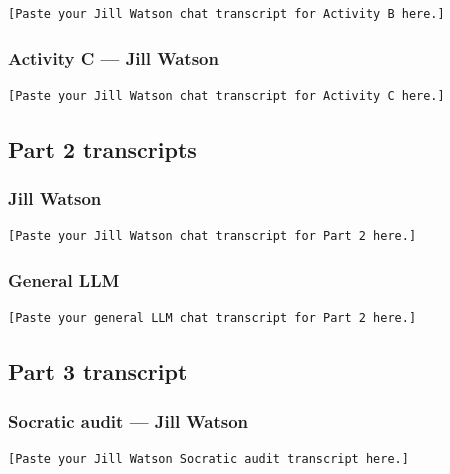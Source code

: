 \documentclass[
	letterpaper, %
]{jdf}
\begin{document}
\begin{verbatim}
[Paste your Jill Watson chat transcript for Activity B here.]
\end{verbatim}

\subsubsection{Activity C --- Jill Watson}

\begin{verbatim}
[Paste your Jill Watson chat transcript for Activity C here.]
\end{verbatim}

\subsection{Part 2 transcripts}

\subsubsection{Jill Watson}

\begin{verbatim}
[Paste your Jill Watson chat transcript for Part 2 here.]
\end{verbatim}

\subsubsection{General LLM}

\begin{verbatim}
[Paste your general LLM chat transcript for Part 2 here.]
\end{verbatim}

\subsection{Part 3 transcript}

\subsubsection{Socratic audit --- Jill Watson}

\begin{verbatim}
[Paste your Jill Watson Socratic audit transcript here.]
\end{verbatim}


\end{document}
